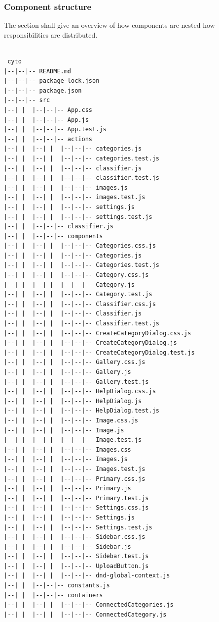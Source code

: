  
\subsubsection{Component structure}
The section shall give an overview of how components are nested how responsibilities are distributed.
\begin{verbatim}

 cyto
|--|--|-- README.md
|--|--|-- package-lock.json
|--|--|-- package.json
|--|--|-- src
|--| |  |--|--|-- App.css
|--| |  |--|--|-- App.js
|--| |  |--|--|-- App.test.js
|--| |  |--|--|-- actions
|--| |  |--| |  |--|--|-- categories.js
|--| |  |--| |  |--|--|-- categories.test.js
|--| |  |--| |  |--|--|-- classifier.js
|--| |  |--| |  |--|--|-- classifier.test.js
|--| |  |--| |  |--|--|-- images.js
|--| |  |--| |  |--|--|-- images.test.js
|--| |  |--| |  |--|--|-- settings.js
|--| |  |--| |  |--|--|-- settings.test.js
|--| |  |--|--|-- classifier.js
|--| |  |--|--|-- components
|--| |  |--| |  |--|--|-- Categories.css.js
|--| |  |--| |  |--|--|-- Categories.js
|--| |  |--| |  |--|--|-- Categories.test.js
|--| |  |--| |  |--|--|-- Category.css.js
|--| |  |--| |  |--|--|-- Category.js
|--| |  |--| |  |--|--|-- Category.test.js
|--| |  |--| |  |--|--|-- Classifier.css.js
|--| |  |--| |  |--|--|-- Classifier.js
|--| |  |--| |  |--|--|-- Classifier.test.js
|--| |  |--| |  |--|--|-- CreateCategoryDialog.css.js
|--| |  |--| |  |--|--|-- CreateCategoryDialog.js
|--| |  |--| |  |--|--|-- CreateCategoryDialog.test.js
|--| |  |--| |  |--|--|-- Gallery.css.js
|--| |  |--| |  |--|--|-- Gallery.js
|--| |  |--| |  |--|--|-- Gallery.test.js
|--| |  |--| |  |--|--|-- HelpDialog.css.js
|--| |  |--| |  |--|--|-- HelpDialog.js
|--| |  |--| |  |--|--|-- HelpDialog.test.js
|--| |  |--| |  |--|--|-- Image.css.js
|--| |  |--| |  |--|--|-- Image.js
|--| |  |--| |  |--|--|-- Image.test.js
|--| |  |--| |  |--|--|-- Images.css
|--| |  |--| |  |--|--|-- Images.js
|--| |  |--| |  |--|--|-- Images.test.js
|--| |  |--| |  |--|--|-- Primary.css.js
|--| |  |--| |  |--|--|-- Primary.js
|--| |  |--| |  |--|--|-- Primary.test.js
|--| |  |--| |  |--|--|-- Settings.css.js
|--| |  |--| |  |--|--|-- Settings.js
|--| |  |--| |  |--|--|-- Settings.test.js
|--| |  |--| |  |--|--|-- Sidebar.css.js
|--| |  |--| |  |--|--|-- Sidebar.js
|--| |  |--| |  |--|--|-- Sidebar.test.js
|--| |  |--| |  |--|--|-- UploadButton.js
|--| |  |--| |  |--|--|-- dnd-global-context.js
|--| |  |--|--|-- constants.js
|--| |  |--|--|-- containers
|--| |  |--| |  |--|--|-- ConnectedCategories.js
|--| |  |--| |  |--|--|-- ConnectedCategory.js

\end{verbatim}
